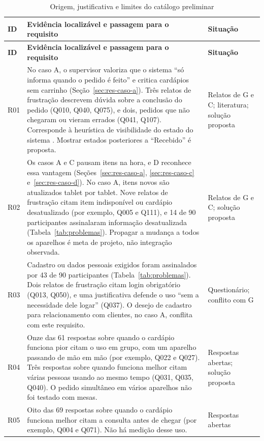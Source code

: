 \begin{longtable}{@{}p{0.9cm}p{10.0cm}p{3.0cm}@{}}
\caption{Origem, justificativa e limites do catálogo preliminar}
\label{tab:rastreabilidade}\\
\toprule
\textbf{ID} & \textbf{Evidência localizável e passagem para o requisito} & \textbf{Situação} \\
\midrule
\endfirsthead
\toprule
\textbf{ID} & \textbf{Evidência localizável e passagem para o requisito} & \textbf{Situação} \\
\midrule
\endhead
R01 & No caso A, o supervisor valoriza que o sistema ``só informa quando o pedido é feito'' e critica cardápios sem carrinho (Seção~\ref{sec:res-caso-a}). Três relatos de frustração descrevem dúvida sobre a conclusão do pedido (Q010, Q040, Q075), e dois, pedidos que não chegaram ou vieram errados (Q041, Q107). Corresponde à heurística de visibilidade do estado do sistema \cite{nielsen1994heuristics}. Mostrar estados posteriores a ``Recebido'' é proposta. & Relatos de G e C; literatura; solução proposta \\
R02 & Os casos A e C pausam itens na hora, e D reconhece essa vantagem (Seções~\ref{sec:res-caso-a}, \ref{sec:res-caso-c} e~\ref{sec:res-caso-d}). No caso A, itens novos são atualizados tablet por tablet. Nove relatos de frustração citam item indisponível ou cardápio desatualizado (por exemplo, Q005 e Q111), e 14 de 90 participantes assinalaram informação desatualizada (Tabela~\ref{tab:problemas}). Propagar a mudança a todos os aparelhos é meta de projeto, não integração observada. & Relatos de G e C; solução proposta \\
R03 & Cadastro ou dados pessoais exigidos foram assinalados por 43 de 90 participantes (Tabela~\ref{tab:problemas}). Dois relatos de frustração citam login obrigatório (Q013, Q050), e uma justificativa defende o uso ``sem a necessidade dele logar'' (Q037). O desejo de cadastro para relacionamento com clientes, no caso A, conflita com este requisito. & Questionário; conflito com G \\
R04 & Onze das 61 respostas sobre quando o cardápio funciona pior citam o uso em grupo, com um aparelho passando de mão em mão (por exemplo, Q022 e Q027). Três respostas sobre quando funciona melhor citam várias pessoas usando ao mesmo tempo (Q031, Q035, Q040). O pedido simultâneo em vários aparelhos não foi testado com mesas. & Respostas abertas; solução proposta \\
R05 & Oito das 69 respostas sobre quando o cardápio funciona melhor citam a consulta antes de chegar (por exemplo, Q004 e Q071). Não há medição desse uso. & Respostas abertas \\

\end{longtable}
